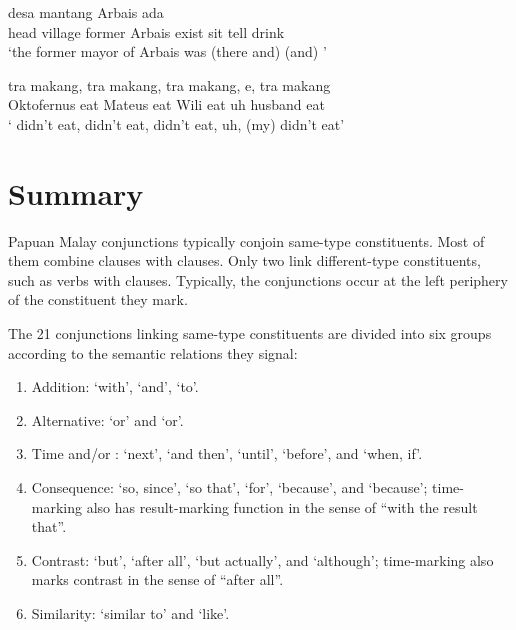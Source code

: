 \ea\label{Example_14.72}
 {desa} {mantang} {Arbais} {ada} {} {} {}\\ %
 head  village  former  Arbais  exist  sit  tell  drink\\
\glt ‘the former mayor of Arbais was  (there and)  (and) ’ \textstyleExampleSource{[081011-024-Cv.0135]}
\z

\ea
\label{Example_14.73}

\gll {}  tra  makang,    tra  makang,    tra makang,  e,    tra  makang\\  
Oktofernus    eat  Mateus    eat  Wili   eat  uh  husband    eat\\
\glt ‘ didn’t eat,  didn’t eat,  didn’t eat, uh, (my)  didn’t eat’ \textstyleExampleSource{[080921-003-CvNP.0005]}
\z

\section{Summary}
\label{Para_14.5}
Papuan Malay conjunctions typically conjoin same-type constituents. Most of them combine clauses with clauses. Only two link different-type constituents, such as verbs with clauses. Typically, the conjunctions occur at the left periphery of the constituent they mark.



The 21 conjunctions linking same-type constituents are divided into six groups according to the semantic relations they signal:
%

\begin{enumerate}
\item Addition:  ‘with’,  ‘and’,  ‘to’.
\item Alternative:  ‘or’ and  ‘or’.
\item Time and/or :  ‘next’,  ‘and then’,  ‘until’,  ‘before’, and  ‘when, if’.
\item Consequence:  ‘so, since’,  ‘so that’,  ‘for’,  ‘because’, and  ‘because’; time-marking  also has result-mark\-ing function in the sense of ``with the result that''.
\item Contrast:  ‘but’,  ‘after all’,  ‘but actually’, and  ‘although’; time-marking  also marks contrast in the sense of ``after all''.
\item Similarity:  ‘similar to’ and  ‘like’.
\end{enumerate}

